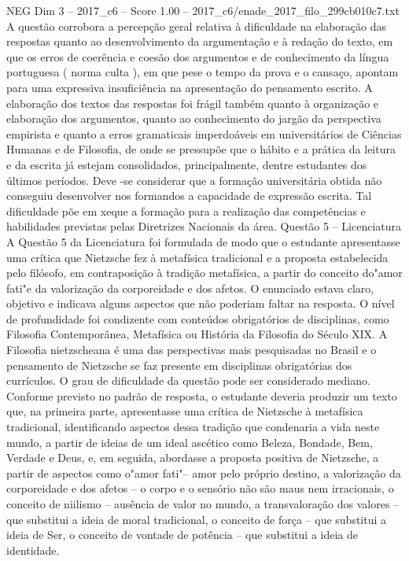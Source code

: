 \begin{textsample}{NEG Dim 3 – 2017\_c6 – Score 1.00 – 2017\_c6/enade\_2017\_filo\_299cb010c7.txt}
A questão corrobora a percepção geral relativa à dificuldade na elaboração das respostas quanto ao desenvolvimento da argumentação e à redação do texto, em que os erros de coerência e coesão dos argumentos e de conhecimento da língua portuguesa ( norma culta ), em que pese o tempo da prova e o cansaço, apontam para uma expressiva insuficiência na apresentação do pensamento escrito.
A elaboração dos textos das respostas foi frágil também quanto à organização e elaboração dos argumentos, quanto ao conhecimento do jargão da perspectiva empirista e quanto a erros gramaticais imperdoáveis em universitários de Ciências Humanas e de Filosofia, de onde se pressupõe que o hábito e a prática da leitura e da escrita já estejam consolidados, principalmente, dentre estudantes dos últimos períodos.
Deve -se considerar que a formação universitária obtida não conseguiu desenvolver nos formandos a capacidade de expressão escrita.
Tal dificuldade põe em xeque a formação para a realização das competências e habilidades previstas pelas Diretrizes Nacionais da área.
Questão 5 – Licenciatura A Questão 5 da Licenciatura foi formulada de modo que o estudante apresentasse uma crítica que Nietzsche fez à metafísica tradicional e a proposta estabelecida pelo filósofo, em contraposição à tradição metafísica, a partir do conceito do"amor fati"e da valorização da corporeidade e dos afetos.
O enunciado estava claro, objetivo e indicava alguns aspectos que não poderiam faltar na resposta.
O nível de profundidade foi condizente com conteúdos obrigatórios de disciplinas, como Filosofia Contemporânea, Metafísica ou História da Filosofia do Século XIX.
A Filosofia nietzscheana é uma das perspectivas mais pesquisadas no Brasil e o pensamento de Nietzsche se faz presente em disciplinas obrigatórias dos currículos.
O grau de dificuldade da questão pode ser considerado mediano.
Conforme previsto no padrão de resposta, o estudante deveria produzir um texto que, na primeira parte, apresentasse uma crítica de Nietzsche à metafísica tradicional, identificando aspectos dessa tradição que condenaria a vida neste mundo, a partir de ideias de um ideal ascético como Beleza, Bondade, Bem, Verdade e Deus, e, em seguida, abordasse a proposta positiva de Nietzsche, a partir de aspectos como o"amor fati"– amor pelo próprio destino, a valorização da corporeidade e dos afetos – o corpo e o sensório não são maus nem irracionais, o conceito de niilismo – ausência de valor no mundo, a transvaloração dos valores – que substitui a ideia de moral tradicional, o conceito de força – que substitui a ideia de Ser, o conceito de vontade de potência – que substitui a ideia de identidade.

\end{textsample}

